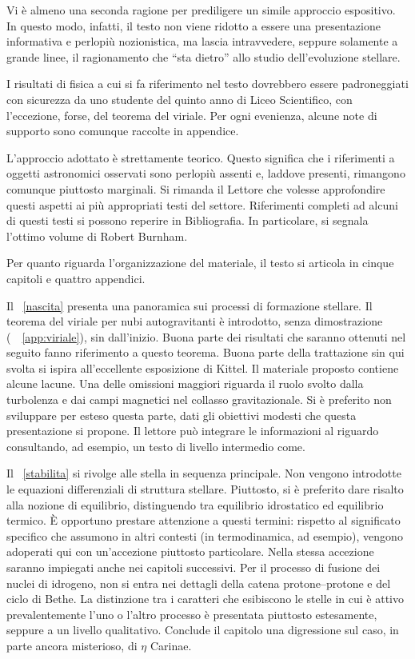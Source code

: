 Vi \`e almeno una seconda ragione per prediligere un simile approccio
espositivo.  In questo modo, infatti, il testo non viene ridotto a essere una
presentazione informativa e perlopi\`u nozionistica, ma lascia intravvedere,
seppure solamente a grande linee, il ragionamento che  ``sta dietro'' allo
studio dell'evoluzione stellare.  


I risultati di fisica a cui si fa riferimento nel testo dovrebbero essere
padroneggiati con sicurezza da uno studente del quinto anno di Liceo
Scientifico, con l'eccezione, forse, del teorema del viriale.  Per ogni
evenienza, alcune note di supporto sono comunque raccolte in appendice.

L'approccio adottato \`e strettamente teorico.  Questo significa che i
riferimenti a oggetti astronomici osservati sono perlopi\`u assenti e, laddove
presenti, rimangono comunque  piuttosto marginali. Si rimanda il Lettore che
volesse approfondire questi aspetti ai pi\`u appropriati testi del settore.
Riferimenti completi ad alcuni di questi testi si possono reperire in
Bibliografia.  In particolare, si segnala l'ottimo volume di Robert
Burnham.

Per quanto riguarda l'organizzazione del materiale, il testo si articola in
cinque capitoli e quattro appendici.

Il \chaptername~\ref{nascita} presenta una panoramica sui processi di formazione
stellare. Il teorema del viriale per nubi autogravitanti \`e introdotto, senza
dimostrazione (\seename~\appendixname~\ref{app:viriale}), sin dall'inizio. Buona
parte dei risultati che saranno ottenuti nel seguito fanno riferimento a questo
teorema.  Buona parte della trattazione sin qui svolta si ispira all'eccellente
esposizione di Kittel.  Il materiale proposto contiene alcune
lacune.  Una delle omissioni maggiori riguarda il ruolo svolto dalla turbolenza
e dai campi magnetici nel collasso gravitazionale.  Si \`e preferito non
sviluppare per esteso questa parte, dati gli obiettivi modesti che questa
presentazione si propone.  Il lettore pu\`o integrare le informazioni al
riguardo consultando, ad esempio, un testo di livello intermedio
come.

Il \chaptername~\ref{stabilita} si rivolge alle stella in sequenza principale.
Non vengono introdotte le equazioni differenziali di struttura stellare.
Piuttosto, si \`e preferito dare risalto alla nozione di equilibrio,
distinguendo tra equilibrio idrostatico ed equilibrio termico.  \`E
opportuno prestare attenzione a questi termini: rispetto al significato
specifico che assumono in altri contesti (in termodinamica, ad esempio), vengono
adoperati qui con un'accezione piuttosto particolare.  Nella stessa accezione
saranno impiegati anche nei capitoli successivi.  Per il processo di fusione dei
nuclei di idrogeno, non si entra nei dettagli della catena protone--protone e
del ciclo di Bethe. La distinzione tra i caratteri che esibiscono le stelle in
cui \`e attivo prevalentemente l'uno o l'altro processo \`e presentata piuttosto
estesamente, seppure a un livello qualitativo.  Conclude il capitolo una
digressione sul caso, in parte ancora misterioso, di $\eta$ Carinae.

